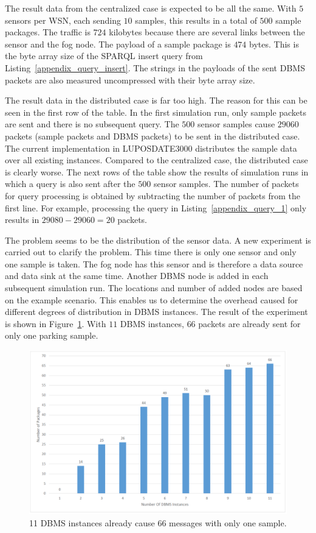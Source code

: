 \documentclass[english,version-2019-11]{uzl-thesis}
\begin{document}
The result data from the centralized case is expected to be all the same. With $5$ sensors per WSN, each sending $10$ samples, this results in a total of $500$ sample packages. The traffic is $724$ kilobytes because there are several links between the sensor and the fog node. The payload of a sample package is $474$ bytes. This is the byte array size of the SPARQL insert query from Listing~\ref{appendix_query_insert}. The strings in the payloads of the sent DBMS packets are also measured uncompressed with their byte array size.

The result data in the distributed case is far too high. The reason for this can be seen in the first row of the table. In the first simulation run, only sample packets are sent and there is no subsequent query. The $500$ sensor samples cause $29060$ packets (sample packets and DBMS  packets) to be sent in the distributed case. The current implementation in LUPOSDATE3000 distributes the sample data over all existing instances. Compared to the centralized case, the distributed case is clearly worse. The next rows of the table show the results of simulation runs in which a query is also sent after the $500$ sensor samples. The number of packets for query processing is obtained by subtracting the number of packets from the first line. For example, processing the query in Listing~\ref{appendix_query_1} only results in $29080 - 29060 = 20$ packets.

The problem seems to be the distribution of the sensor data. A new experiment is carried out to clarify the problem. This time there is only one sensor and only one sample is taken. The fog node has this sensor and is therefore a data source and data sink at the same time. Another DBMS node is added in each subsequent simulation run. The locations and number of added nodes are based on the example scenario. This enables us to determine the overhead caused for different degrees of distribution in DBMS instances. The result of the experiment is shown in Figure~\ref{figure_evaluation_sampling_distribute}. With $11$ DBMS instances, $66$ packets are already sent for only one parking sample.
\begin{figure}[htpb]
  \centering
  \includegraphics[scale=0.5]{figure_evaluation_sampling_distribute.pdf}
  \caption{11 DBMS instances already cause 66 messages with only one sample.\label{figure_evaluation_sampling_distribute}}
  
\end{figure}
\end{document}
